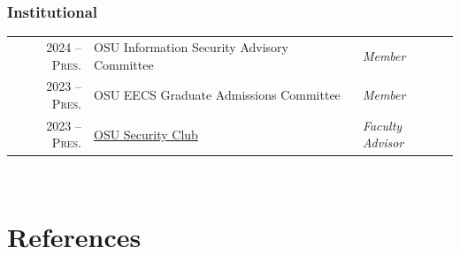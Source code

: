 \documentclass[10pt,singlecolumn]{article} %
\begin{document}


\subsubsection*{Institutional}

\begin{tabular}{rll}
2024 -- \textsc{Pres.} & OSU Information Security Advisory Committee & \emph{Member} \\
2023 -- \textsc{Pres.} & OSU EECS Graduate Admissions Committee & \emph{Member} \\
2023 -- \textsc{Pres.} & \href{https://osusec.org/}{OSU Security Club} & \emph{Faculty Advisor} \\
\end{tabular} \\



\section{References}
\end{document}
